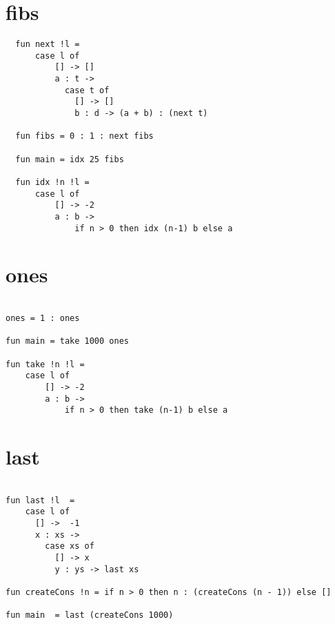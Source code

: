 \documentclass[diploma]{softlab-thesis}
\begin{document}
\section{fibs}

\begin{verbatim}
  fun next !l = 
      case l of
          [] -> []
          a : t -> 
            case t of
              [] -> []
              b : d -> (a + b) : (next t)
  
  fun fibs = 0 : 1 : next fibs
  
  fun main = idx 25 fibs

  fun idx !n !l =
      case l of 
          [] -> -2
          a : b -> 
              if n > 0 then idx (n-1) b else a
\end{verbatim}

\section{ones}

\begin{verbatim}

ones = 1 : ones

fun main = take 1000 ones

fun take !n !l = 
    case l of 
        [] -> -2 
        a : b -> 
            if n > 0 then take (n-1) b else a
\end{verbatim}

\section{last}

\begin{verbatim}

fun last !l  =
    case l of 
      [] ->  -1
      x : xs -> 
        case xs of 
          [] -> x 
          y : ys -> last xs

fun createCons !n = if n > 0 then n : (createCons (n - 1)) else []

fun main  = last (createCons 1000)

\end{verbatim}
\end{document}
